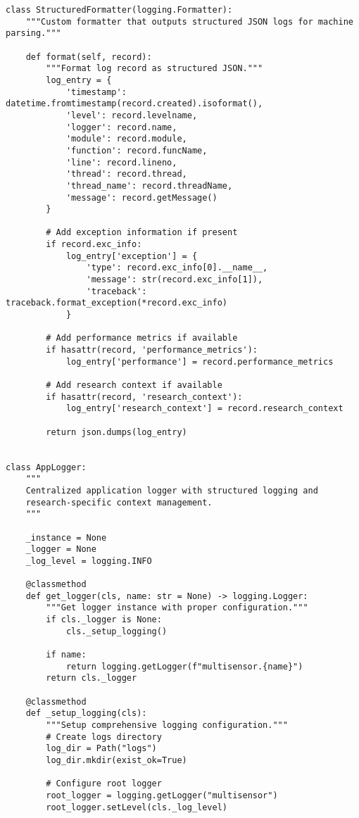 \documentclass[11pt,a4paper]{article}
\begin{document}
\begin{verbatim}
class StructuredFormatter(logging.Formatter):
    """Custom formatter that outputs structured JSON logs for machine parsing."""

    def format(self, record):
        """Format log record as structured JSON."""
        log_entry = {
            'timestamp': datetime.fromtimestamp(record.created).isoformat(),
            'level': record.levelname,
            'logger': record.name,
            'module': record.module,
            'function': record.funcName,
            'line': record.lineno,
            'thread': record.thread,
            'thread_name': record.threadName,
            'message': record.getMessage()
        }

        # Add exception information if present
        if record.exc_info:
            log_entry['exception'] = {
                'type': record.exc_info[0].__name__,
                'message': str(record.exc_info[1]),
                'traceback': traceback.format_exception(*record.exc_info)
            }

        # Add performance metrics if available
        if hasattr(record, 'performance_metrics'):
            log_entry['performance'] = record.performance_metrics

        # Add research context if available
        if hasattr(record, 'research_context'):
            log_entry['research_context'] = record.research_context

        return json.dumps(log_entry)


class AppLogger:
    """
    Centralized application logger with structured logging and
    research-specific context management.
    """

    _instance = None
    _logger = None
    _log_level = logging.INFO

    @classmethod
    def get_logger(cls, name: str = None) -> logging.Logger:
        """Get logger instance with proper configuration."""
        if cls._logger is None:
            cls._setup_logging()

        if name:
            return logging.getLogger(f"multisensor.{name}")
        return cls._logger

    @classmethod
    def _setup_logging(cls):
        """Setup comprehensive logging configuration."""
        # Create logs directory
        log_dir = Path("logs")
        log_dir.mkdir(exist_ok=True)

        # Configure root logger
        root_logger = logging.getLogger("multisensor")
        root_logger.setLevel(cls._log_level)


\end{verbatim}
\end{document}
